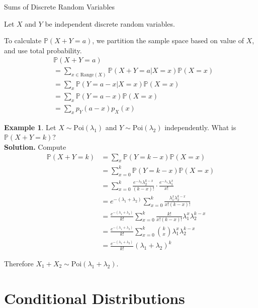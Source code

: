 \documentclass[a4paper,11pt]{amsbook}
\makeatletter
\def\section{\@startsection{section}{2}%
    \z@{1\linespacing\@plus1\linespacing}{.5\linespacing}%
    {\large\normalfont\bfseries\centering\color{darkblue}}}
\theoremstyle{definition}
\newtheorem{example}{\hspace{-2em} \color{darkblue} Example}[chapter]
\theoremstyle{remark}
\renewcommand{\P}{\mathbb{P}}
\newcommand\0{\varnothing}
\newcommand\Poi{\text{Poi}}
\makeatother
\begin{document}
    \section{Sums of Discrete Random Variables}

    Let $X$ and $Y$ be independent discrete random variables.

    To calculate $\P(X+Y=a)$, we partition the sample space based on value of $X$, and use total probability.
    \begin{align*}
        &\P(X+Y=a) \\
        &=\sum_{x\in\text{Range}(X)}\P(X+Y=a|X=x)\P(X=x) \\
        &=\sum_x\P(Y=a-x|X=x)\P(X=x) \\
        &=\sum_x\P(Y=a-x)\P(X=x) \tag{independence} \\
        &=\sum_x p_Y(a-x)p_X(x)
    \end{align*}

    \begin{example}
        Let $X\sim\Poi(\lambda_1)$ and $Y\sim\Poi(\lambda_2)$ independently.
        What is $\P(X+Y=k)$?\\
        \textbf{Solution.} Compute \begin{align*}
            \P(X+Y=k)&=\sum_x\P(Y=k-x)\P(X=x) \\
            &=\sum_{x=0}^k\P(Y=k-x)\P(X=x) \\
            &=\sum_{x=0}^k\frac{e^{-\lambda_2}\lambda_2^{k-x}}{(k-x)!}\cdot\frac{e^{-\lambda_1}\lambda_1^x}{x!} \\
            &=e^{-(\lambda_1+\lambda_2)}\sum_{x=0}^k\frac{\lambda_1^x\lambda_2^{k-x}}{x!(k-x)!} \\
            &=\frac{e^{-(\lambda_1+\lambda_2)}}{k!}\sum_{x=0}^k\frac{k!}{x!(k-x)!}\lambda_1^x\lambda_2^{k-x} \\
            &=\frac{e^{-(\lambda_1+\lambda_2)}}{k!}\sum_{x=0}^k\binom kx\lambda_1^x\lambda_2^{k-x} \\
            &=\frac{e^{-(\lambda_1+\lambda_2)}}{k!}(\lambda_1+\lambda_2)^k \tag{binomial thm}
        \end{align*}

        Therefore $X_1+X_2\sim\Poi(\lambda_1+\lambda_2)$.
    \end{example}

\chapter{Conditional Distributions}
\end{document}
